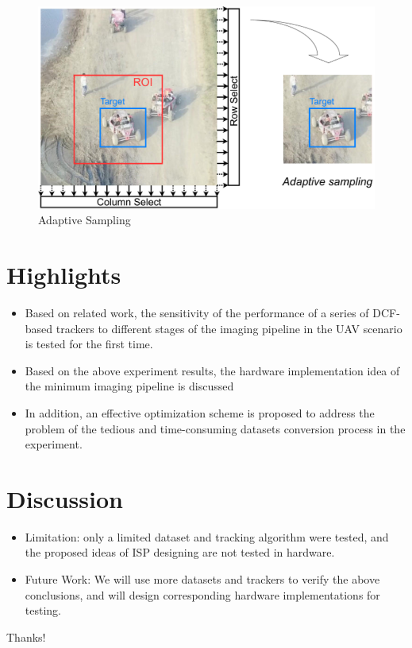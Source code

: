 \documentclass{beamer}
\begin{document}
\begin{frame}
    \begin{figure}[htpb]
        \begin{center}
            \includegraphics[width=0.7\linewidth]{fig/ad_s.pdf}
            \caption{Adaptive Sampling}
        \end{center}
    \end{figure}
\end{frame}

\section{Highlights}

\begin{frame}
    \begin{itemize}[<+-| alert@+>]
        \item Based on related work, the sensitivity of the performance of a series of DCF-based trackers to different stages of the imaging pipeline in the UAV scenario is tested for the first time.
        \item Based on the above experiment results, the hardware implementation idea of the minimum imaging pipeline is discussed
        \item In addition, an effective optimization scheme is proposed to address the problem of the tedious and time-consuming datasets conversion process in the experiment.
    \end{itemize}
\end{frame}

\section{Discussion}

\begin{frame}
    \begin{itemize}[<+-| alert@+>]
        \item Limitation: only a limited dataset and tracking algorithm were tested, and the proposed ideas of ISP designing are not tested in hardware.
        \item Future Work: We will use more datasets and trackers to verify the above conclusions, and will design corresponding hardware implementations for testing.
    \end{itemize}
\end{frame}

\begin{frame}
    \begin{center}
        {\Huge\calligra Thanks!}
    \end{center}
\end{frame}
\end{document}
